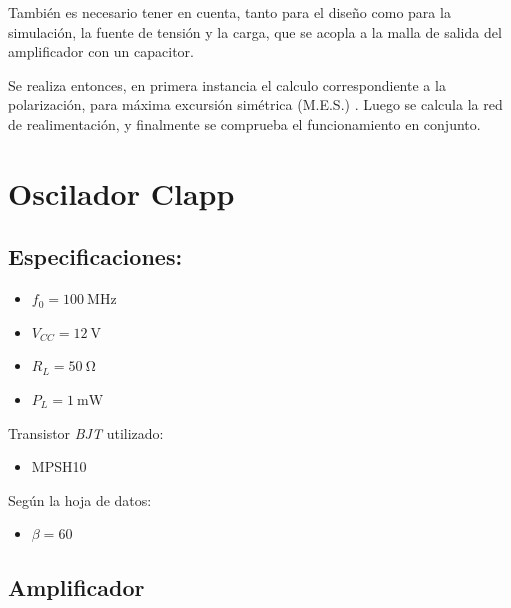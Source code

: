 \documentclass[journal]{IEEEtran}
\begin{document}
También es necesario tener en cuenta, tanto para el diseño como para la simulación, la fuente de tensión y la carga, que se acopla a la malla de salida del amplificador con un capacitor.

Se realiza entonces, en primera instancia el calculo correspondiente a la polarización, para máxima excursión simétrica (M.E.S.) \cite{floyd}. Luego se calcula la red de realimentación, y finalmente se comprueba el funcionamiento en conjunto.

\section{Oscilador Clapp}
\subsection{Especificaciones:}
\begin{itemize}
    \item $f_0=\SI{100}{\mega\hertz}$
    \item $V_{CC}=\SI{12}{\volt}$
    \item $R_L=\SI{50}{\ohm}$
    \item $P_L=\SI{1}{\milli\watt}$
\end{itemize}
Transistor \emph{BJT} utilizado:
\begin{itemize}
    \item MPSH10
\end{itemize}
Según la hoja de datos:
\begin{itemize}
    \item $\beta = 60$
\end{itemize}

\subsection{Amplificador}
\end{document}
